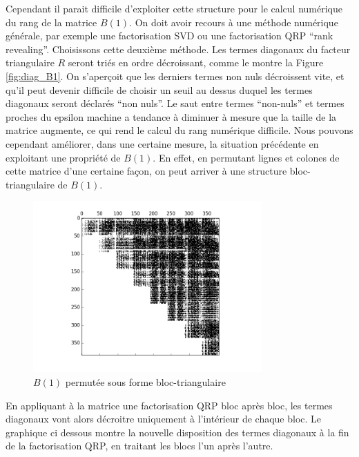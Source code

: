 \documentclass{standalone}
\begin{document}
Cependant il parait difficile d'exploiter cette structure pour le calcul numérique du rang de la matrice $B(1)$. On doit avoir recours à une méthode numérique générale, par exemple une factorisation SVD ou une factorisation QRP ``rank revealing''. Choisissons cette deuxième méthode. Les termes diagonaux du facteur triangulaire $R$ seront triés en ordre décroissant, comme le montre la Figure \ref{fig:diag_B1}. On s'aperçoit que les derniers termes non nuls décroissent vite, et qu'il peut devenir difficile de choisir un seuil au dessus duquel les termes diagonaux seront déclarés ``non nuls''. Le saut entre termes ``non-nuls'' et termes proches du epsilon machine a tendance à diminuer à mesure que la taille de la matrice augmente, ce qui rend le calcul du rang numérique difficile. Nous pouvons cependant améliorer, dans une certaine mesure, la situation précédente en exploitant une propriété de $B(1)$. En effet, en permutant lignes et colones de cette matrice d'une certaine façon, on peut arriver à une structure bloc-triangulaire de $B(1)$.
\begin{figure}[h]
  \caption{$B(1)$ permutée sous forme bloc-triangulaire}
  \centering
  \includegraphics[width=0.78\textwidth]{../png/beztri.png}
\end{figure}
En appliquant à la matrice une factorisation QRP bloc après bloc, les termes diagonaux vont alors décroitre uniquement à l'intérieur de chaque bloc. Le graphique ci dessous montre la nouvelle disposition des termes diagonaux à la fin de la factorisation QRP, en traitant les blocs l'un après l'autre.
\end{document}
